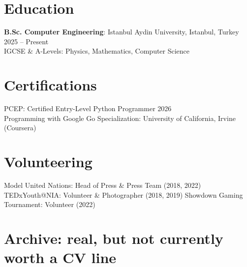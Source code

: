 \documentclass[10pt,a4paper]{article}
\begin{document}

\section*{Education}
\textbf{B.Sc. Computer Engineering}: Istanbul Aydin University, Istanbul, Turkey \hfill 2025 -- Present\\
IGCSE \& A-Levels: Physics, Mathematics, Computer Science

\section*{Certifications}
PCEP: Certified Entry-Level Python Programmer \hfill 2026\\
Programming with Google Go Specialization: University of California, Irvine (Coursera)

\section*{Volunteering}
Model United Nations: Head of Press \& Press Team (2018, 2022) \textbar{} TEDxYouth@NIA: Volunteer \& Photographer (2018, 2019) \textbar{} Showdown Gaming Tournament: Volunteer (2022)


\section*{Archive: real, but not currently worth a CV line}
\end{document}
